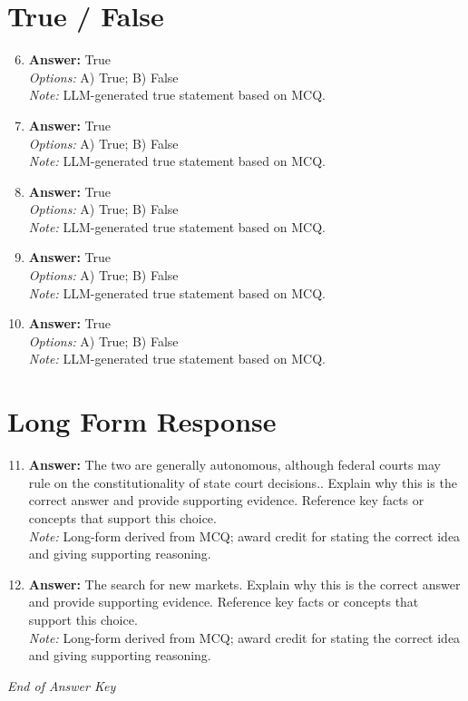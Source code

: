 \documentclass[12pt]{article}
\begin{document}
\section*{True / False}
\begin{enumerate}[label=\arabic*.]
\setcounter{enumi}{5}
\item \textbf{Answer:} True
\\ \textit{Options:} A) True; B) False
\\ \textit{Note:} LLM-generated true statement based on MCQ.
\item \textbf{Answer:} True
\\ \textit{Options:} A) True; B) False
\\ \textit{Note:} LLM-generated true statement based on MCQ.
\item \textbf{Answer:} True
\\ \textit{Options:} A) True; B) False
\\ \textit{Note:} LLM-generated true statement based on MCQ.
\item \textbf{Answer:} True
\\ \textit{Options:} A) True; B) False
\\ \textit{Note:} LLM-generated true statement based on MCQ.
\item \textbf{Answer:} True
\\ \textit{Options:} A) True; B) False
\\ \textit{Note:} LLM-generated true statement based on MCQ.
\end{enumerate}

\section*{Long Form Response}
\begin{enumerate}[label=\arabic*.]
\setcounter{enumi}{10}
\item \textbf{Answer:} The two are generally autonomous, although federal courts may rule on the constitutionality of state court decisions.. Explain why this is the correct answer and provide supporting evidence. Reference key facts or concepts that support this choice.
\\ \textit{Note:} Long-form derived from MCQ; award credit for stating the correct idea and giving supporting reasoning.
\item \textbf{Answer:} The search for new markets. Explain why this is the correct answer and provide supporting evidence. Reference key facts or concepts that support this choice.
\\ \textit{Note:} Long-form derived from MCQ; award credit for stating the correct idea and giving supporting reasoning.
\end{enumerate}

\vfill
\noindent\textit{End of Answer Key}
\end{document}
